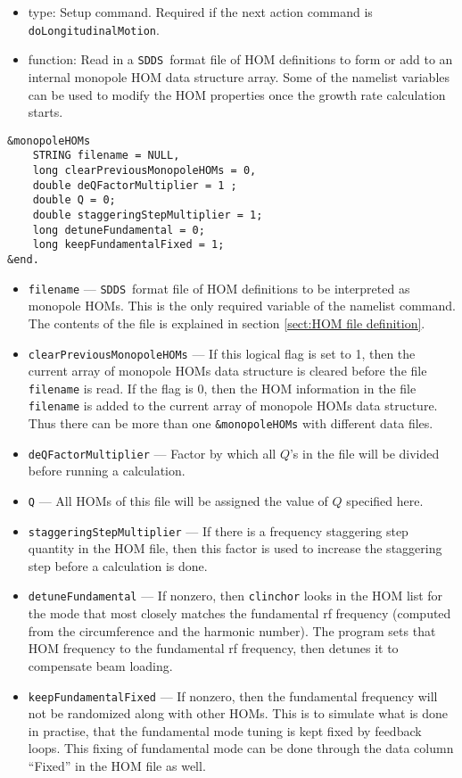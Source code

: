\documentclass[11pt]{article}
\newcommand{\SDDS}{{\tt SDDS}}
\begin{document}
\begin{itemize}
\item type: Setup command. Required if the next action command is {\tt
      doLongitudinalMotion}.
\item function: Read in a \SDDS\ format file of HOM definitions to
      form or add to an internal monopole HOM data structure array.
      Some of the namelist variables can be used to modify the HOM
      properties once the growth rate calculation starts.
\end{itemize}
\begin{verbatim}
&monopoleHOMs
    STRING filename = NULL,
    long clearPreviousMonopoleHOMs = 0,
    double deQFactorMultiplier = 1 ;
    double Q = 0;
    double staggeringStepMultiplier = 1;
    long detuneFundamental = 0;
    long keepFundamentalFixed = 1;
&end.
\end{verbatim}
\begin{itemize}
\item {\tt filename} --- \SDDS\ format file of HOM definitions to be
      interpreted as monopole HOMs. This is the only required variable
      of the namelist command. The contents of the file is explained
      in section \ref{sect:HOM file definition}.
\item {\tt clearPreviousMonopoleHOMs} --- If this logical flag is set
      to 1, then the current array of monopole HOMs data structure is
      cleared before the file {\tt filename} is read. If the flag is
      0, then the HOM information in the file {\tt filename} is added
      to the current array of monopole HOMs data structure. Thus there
      can be more than one {\tt \&monopoleHOMs} with different data files.
\item {\tt deQFactorMultiplier} --- Factor by which all $Q$'s in the 
      file will be divided before running a calculation.
\item {\tt Q} --- All HOMs of this file will be assigned the value of $Q$
      specified here.
\item {\tt staggeringStepMultiplier} --- If there is a frequency staggering step
      quantity in the HOM file, then this factor is used to increase the 
      staggering step before a calculation is done.
\item {\tt detuneFundamental} --- If nonzero, then {\tt clinchor} looks in
 the HOM list for the mode that most closely matches the fundamental rf
 frequency (computed from the circumference and the harmonic number).
 The program sets that HOM frequency to the fundamental rf frequency, then
detunes it to compensate beam loading.  
\item {\tt keepFundamentalFixed} ---  If nonzero, then the fundamental frequency will not be randomized along with other HOMs. 
This is to simulate what is done in practise, that the fundamental mode
tuning is kept fixed by feedback loops.
This fixing of fundamental mode can be done through the data column ``Fixed'' in the HOM file as well.
\end{itemize}
\end{document}
